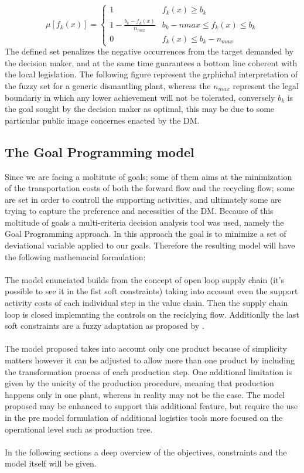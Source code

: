 \documentclass{article}
\begin{document}
$$
\mu [f_k(x)]=
\begin{cases}
1 & f_k(x) \geq b_k \\
1-\frac{b_k-f_k(x)}{n_{max}} & b_k -n{max} \leq f_k(x) \leq b_k \\
0 & f_k(x) \leq b_k - n_{max}
\end{cases}
$$
The defined set penalizes the negative occurrences from the target demanded by the decision maker, and at the same time guarantees a bottom line coherent with the local legislation. The following figure represent the grphichal interpretation of the fuzzy set for a generic dismantling plant, whereas the $n_{max}$ represent the legal boundariy in which any lower achievement will not be tolerated, conversely $b_k$ is the goal sought by the decision maker as optimal, this may be due to some particular public image concernes enacted by the DM. 

\subsection{The Goal Programming model}
Since we are facing a moltitute of goals; some of them aims at the minimization of the transportation costs of both the forward flow and the recycling flow; some are set in order to controll the supporting activities, and ultimately some are trying to capture the preference and necessities of the DM.
Because of this moltitude of goals a multi-criteria decision analysis tool was used, namely the Goal Programming approach. In this approach the goal is to minimize a set of deviational variable applied to our goals. Therefore the resulting model will have the following mathemacial formulation:
\\
\\ 
The model enunciated builds from the concept of open loop supply chain (it's possible to see it in the fist soft constraints) taking into account even the support activity costs of each individual step in the value chain. Then the supply chain loop is closed implemnting the controls on the reciclying flow. Additionlly the last soft constraints are a fuzzy adaptation as proposed by \cite{}.
\\
\\
The model proposed takes into account only one product because of simplicity matters however it can be adjusted to allow more than one product by including the transformation process of each production step. One additional limitation is given by the unicity of the production procedure, meaning that production happens only in one plant, whereas in reality may not be the case. The model proposed may be enhanced to support this additional feature, but require the use in the pre model formulation of additional logistics tools more focused on the operational level such as production tree.
\\
\\
In the following sections a deep overview of the objectives, constraints and the model itself will be given.
\end{document}
